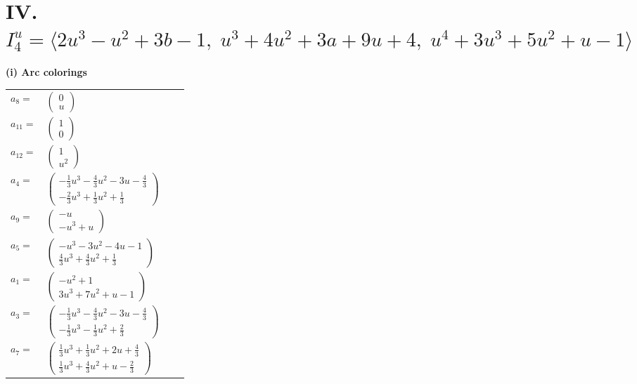 \documentclass[1p]{elsarticle_modified}
\theoremstyle{definition}
\begin{document}
\centering \section*{IV. $I^u_{4}= \langle 2 u^3- u^2+3 b-1,\;u^3+4 u^2+3 a+9 u+4,\;u^4+3 u^3+5 u^2+u-1 \rangle$}
\flushleft \textbf{(i) Arc colorings}\\
\begin{tabular}{m{7pt} m{180pt} m{7pt} m{180pt} }
\flushright $a_{8}=$&$\begin{pmatrix}0\\u\end{pmatrix}$ \\
\flushright $a_{11}=$&$\begin{pmatrix}1\\0\end{pmatrix}$ \\
\flushright $a_{12}=$&$\begin{pmatrix}1\\u^2\end{pmatrix}$ \\
\flushright $a_{4}=$&$\begin{pmatrix}-\frac{1}{3} u^3-\frac{4}{3} u^2-3 u-\frac{4}{3}\\-\frac{2}{3} u^3+\frac{1}{3} u^2+\frac{1}{3}\end{pmatrix}$ \\
\flushright $a_{9}=$&$\begin{pmatrix}- u\\- u^3+u\end{pmatrix}$ \\
\flushright $a_{5}=$&$\begin{pmatrix}- u^3-3 u^2-4 u-1\\\frac{4}{3} u^3+\frac{4}{3} u^2+\frac{1}{3}\end{pmatrix}$ \\
\flushright $a_{1}=$&$\begin{pmatrix}- u^2+1\\3 u^3+7 u^2+u-1\end{pmatrix}$ \\
\flushright $a_{3}=$&$\begin{pmatrix}-\frac{1}{3} u^3-\frac{4}{3} u^2-3 u-\frac{4}{3}\\-\frac{1}{3} u^3-\frac{1}{3} u^2+\frac{2}{3}\end{pmatrix}$ \\
\flushright $a_{7}=$&$\begin{pmatrix}\frac{1}{3} u^3+\frac{1}{3} u^2+2 u+\frac{4}{3}\\\frac{1}{3} u^3+\frac{4}{3} u^2+u-\frac{2}{3}\end{pmatrix}$ \\

\end{tabular}
\end{document}
